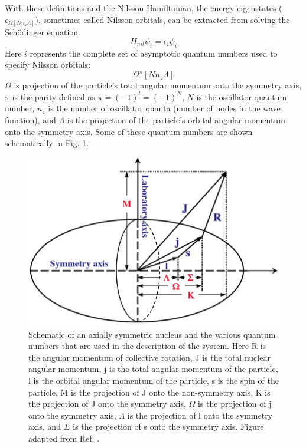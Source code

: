 With these definitions and the Nilsson Hamiltonian, the energy eigenstates ($\epsilon_{\Omega[Nn_z\Lambda]}$), sometimes called Nilsson orbitals, can be extracted from solving the Sch\"odinger equation.
\begin{equation}
\label{eqn:chp2-schodinger-eqn-nilsson}
H_{nil}\psi_{i}=\epsilon_{i}\psi_{i}
\end{equation}
Here $i$ represents the complete set of asymptotic quantum numbers used to specify Nilsson orbitals:
\begin{equation}
\label{eqn:chp2-nilsson-numbers}
\Omega^{\pi}[Nn_z\Lambda]
\end{equation}
$\Omega$ is projection of the particle's total angular momentum onto the symmetry axis, $\pi$ is the parity defined as $\pi=(-1)^{l}=(-1)^{N}$, $N$ is the oscillator quantum number, $n_z$ is the number of oscillator quanta (number of nodes in the wave function), and $\Lambda$ is the projection of the particle's orbital angular momentum onto the symmetry axis. Some of these quantum numbers are shown schematically in Fig. \ref{fig:chp2-nillson-qn}. 

\begin{figure}[hb!]
\centerline{\includegraphics[height=0.22\textheight]{./img/c2/nilsondescr.png}}
	\caption{Schematic of an axially symmetric nucleus and the various quantum numbers that are used in the description of the system. Here R is the angular momentum of collective rotation, J is the total nuclear angular momentum, j is the total angular momentum of the particle, l is the orbital angular momentum of the particle, s is the spin of the particle, M is the projection of J onto the non-symmetry axis, K is the projection of J onto the symmetry axis, $\Omega$ is the projection of j onto the symmetry axis, $\Lambda$ is the projection of l onto the symmetry axis, and $\Sigma$ is the projection of s onto the symmetry axis. Figure adapted from Ref. \cite{danielDissertation}.\label{fig:chp2-nillson-qn}}
\end{figure}


